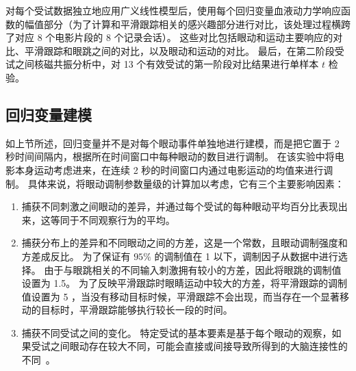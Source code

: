 对每个受试数据独立地应用广义线性模型后，使用每个回归变量血液动力学响应函数的幅值部分（为了计算和平滑跟踪相关的感兴趣部分进行对比，该处理过程横跨了对应 8 个电影片段的 8 个记录会话）。
这些对比包括眼动和运动主要响应的对比、平滑跟踪和眼跳之间的对比，以及眼动和运动的对比。
最后，在第二阶段受试之间核磁共振分析中，对 13 个有效受试的第一阶段对比结果进行单样本 $t$ 检验。

\subsection{回归变量建模} \label{sec:regressor_modelling}
如上节所述，回归变量并不是对每个眼动事件单独地进行建模，而是把它置于 2 秒时间间隔内，根据所在时间窗口中每种眼动的数目进行调制。
在该实验中将电影本身运动考虑进来，在连续 2 秒的时间窗口内通过电影运动的均值来进行调制。
%
具体来说，将眼动调制参数量级的计算加以考虑，它有三个主要影响因素：
\begin{enumerate}
	\item 捕获不同刺激之间眼动的差异，并通过每个受试的每种眼动平均百分比表现出来，这等同于不同观察行为的平均。
	
	\item 捕获分布上的差异和不同眼动之间的方差，这是一个常数，且眼动调制强度和方差成反比。
	为了保证有 $95\%$ 的调制值在 1 以下，调制因子从数据中进行选择。
	由于与眼跳相关的不同输入刺激拥有较小的方差，因此将眼跳的调制值设置为 1.5。
	为了反映平滑跟踪时眼睛运动中较大的方差，将平滑跟踪的调制值设置为 5 ，当没有移动目标时候，平滑跟踪不会出现，而当存在一个显著移动的目标时，平滑跟踪能够执行较长一段的时间。
	
	\item 捕获不同受试之间的变化。
	特定受试的基本要素是基于每个眼动的观察，如果受试之间眼动存在较大不同，可能会直接或间接导致所得到的大脑连接性的不同~\cite{mueller2013individual,vanderwal2017individual}。
\end{enumerate}
